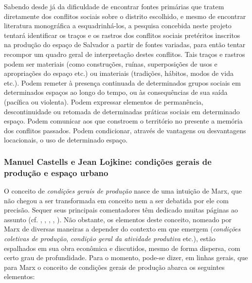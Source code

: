 Sabendo desde já da dificuldade de encontrar fontes primárias que tratem diretamente dos conflitos sociais sobre o distrito escolhido, e mesmo de encontrar literatura monográfica a esquadrinhá-los, a pesquisa concebida neste projeto tentará identificar os traços e os rastros dos conflitos sociais pretéritos inscritos na produção do espaço de Salvador a partir de fontes variadas, para então tentar recompor um quadro geral de interpretação destes conflitos. Tais traços e rastros podem ser materiais (como construções, ruínas, superposições de usos e apropriações do espaço etc.) ou imateriais (tradições, hábitos, modos de vida etc.). Podem remeter à presença continuada de determinados grupos sociais em determinados espaços ao longo do tempo, ou às consequências de sua saída (pacífica ou violenta). Podem expressar elementos de permanência, descontinuidade ou retomada de determinadas práticas sociais em determinado espaço. Podem comunicar aos que constroem o território no presente a memória dos conflitos passados. Podem condicionar, através de vantagens ou desvantagens locacionais, o uso de determinado espaço. 

\subsubsection{Manuel Castells e Jean Lojkine: condições gerais de produção e espaço urbano}\label{subsubsec:mancastjeanlojk}

O conceito de \textit{condições gerais de produção} nasce de uma intuição de Marx, que não chegou a ser transformada em conceito nem a ser debatida por ele com precisão. Sequer seus principais comentadores têm dedicado muitas páginas ao assunto (cf. , , , , ). Não obstante, os elementos deste conceito, nomeado por Marx de diversas maneiras a depender do contexto em que emergem (\textit{condições coletivas de produção}, \textit{condição geral da atividade produtiva} etc.), estão espalhados em sua obra econômica e discutidos, mesmo de forma dispersa, com certo grau de profundidade. Para o momento, pode-se dizer, em linhas gerais, que para Marx o conceito de condições gerais de produção abarca os seguintes elementos:

